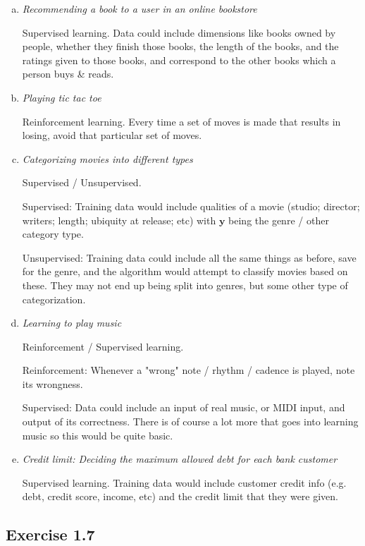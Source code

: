 \documentclass{article}
\renewcommand{\vec}[1]{\mathbf{#1}}
\begin{document}
\begin{enumerate}[(a)]
	\item \textit{Recommending a book to a user in an online bookstore}

    Supervised learning. Data could include dimensions like books owned by people, whether 
    they finish those books, the length of the books, and the ratings given to those books, 
    and correspond to the other books which a person buys \& reads.
	
	\item \textit{Playing tic tac toe}
	
    Reinforcement learning. Every time a set of moves is made that results in losing, avoid 
    that particular set of moves.
	
	\item \textit{Categorizing movies into different types}
	
    Supervised / Unsupervised.

    Supervised: Training data would include qualities of a movie (studio; director; writers; 
    length; ubiquity at release; etc) with $\vec{y}$ being the genre / other category type.

    Unsupervised: Training data could include all the same things as before, save for the 
    genre, and the algorithm would attempt to classify movies based on these. They may not 
    end up being split into genres, but some other type of categorization.
	
	\item \textit{Learning to play music}
	
    Reinforcement / Supervised learning.

    Reinforcement: Whenever a "wrong" note / rhythm / cadence is played, note its wrongness.

    Supervised: Data could include an input of real music, or MIDI input, and output of 
    its correctness. There is of course a lot more that goes into learning music so this 
    would be quite basic.
	
	\item \textit{Credit limit: Deciding the maximum allowed debt for each bank customer}
	
    Supervised learning. Training data would include customer credit info (e.g. debt, 
    credit score, income, etc) and the credit limit that they were given.
	
\end{enumerate}

\subsection*{Exercise 1.7}
\end{document}
